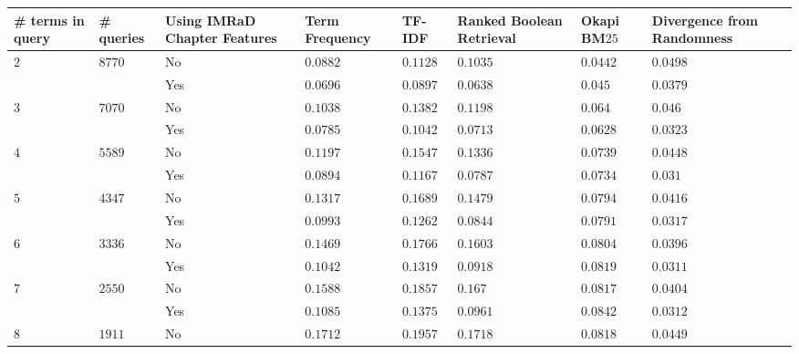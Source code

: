 \begin{table}[h]
  \begin{adjustwidth}{-2cm}{}
    \begin{tabular}{ C{1cm} C{1cm} C{2.1cm} C{2.1cm} C{2.1cm} C{2.1cm} C{2.1cm} C{2.1cm} }
      \toprule
      \textbf{\# terms in query} & \textbf{\# queries} & \textbf{Using IMRaD Chapter Features} & \textbf{Term Frequency} & \textbf{TF-IDF} & \textbf{Ranked Boolean Retrieval} & \textbf{Okapi BM$25$} & \textbf{Divergence from Randomness} \\ \midrule
       &  & No  & $0.0882$ & $0.1128$ & $0.1035$ & $0.0442$ & \color{blue}$\mathbf{0.0498}$  \\
                                                    && Yes & $0.0696$ & $0.0897$ & $0.0638$ & $0.045$  & \color{Plum}$\mathbf{0.0379}$  \\ \midrule
       &  & No  & $0.1038$ & $0.1382$ & $0.1198$ & $0.064$  & $0.046$   \\
                                                    && Yes & $0.0785$ & $0.1042$ & $0.0713$ & $0.0628$ & $0.0323$  \\ \midrule
       &  & No  & $0.1197$ & $0.1547$ & $0.1336$ & $0.0739$ & $0.0448$  \\
                                                    && Yes & $0.0894$ & $0.1167$ & $0.0787$ & $0.0734$ & $0.031$   \\ \midrule
       &  & No  & $0.1317$ & $0.1689$ & $0.1479$ & $0.0794$ & $0.0416$  \\
                                                    && Yes & $0.0993$ & $0.1262$ & $0.0844$ & $0.0791$ & $0.0317$  \\ \midrule
       &  & No  & $0.1469$ & $0.1766$ & $0.1603$ & $0.0804$ & $0.0396$  \\
                                                    && Yes & $0.1042$ & $0.1319$ & $0.0918$ & $0.0819$ & $0.0311$  \\ \midrule
       &  & No  & $0.1588$ & $0.1857$ & $0.167$  & $0.0817$ & $0.0404$  \\
                                                    && Yes & $0.1085$ & $0.1375$ & $0.0961$ & $0.0842$ & $0.0312$  \\ \midrule
       &  & No  & $0.1712$ & $0.1957$ & $0.1718$ & $0.0818$ & $0.0449$  \\

\end{tabular}
\end{adjustwidth}
\end{table}
